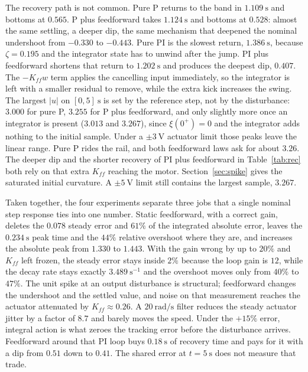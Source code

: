 \documentclass[12pt,a4paper]{article}
\begin{document}
The recovery path is not common.
Pure P returns to the band in \(1.109~\mathrm{s}\) and bottoms at \(0.565\).
P plus feedforward takes \(1.124~\mathrm{s}\) and bottoms at \(0.528\): almost the same settling, a deeper dip, the same mechanism that deepened the nominal undershoot from \(-0.330\) to \(-0.443\).
Pure PI is the slowest return, \(1.386~\mathrm{s}\), because \(\zeta=0.195\) and the integrator state has to unwind after the jump.
PI plus feedforward shortens that return to \(1.202~\mathrm{s}\) and produces the deepest dip, \(0.407\).
The \(-K_{ff}w\) term applies the cancelling input immediately, so the integrator is left with a smaller residual to remove, while the extra kick increases the swing.
The largest \(|u|\) on \([0,5]~\mathrm{s}\) is set by the reference step, not by the disturbance: \(3.000\) for pure P, \(3.255\) for P plus feedforward, and only slightly more once an integrator is present (\(3.013\) and \(3.267\)), since \(\xi(0^+)=0\) and the integrator adds nothing to the initial sample.
Under a \(\pm 3~\mathrm{V}\) actuator limit those peaks leave the linear range. Pure P rides the rail, and both feedforward laws ask for about \(3.26\).
The deeper dip and the shorter recovery of PI plus feedforward in Table~\ref{tab:rec} both rely on that extra \(K_{ff}\) reaching the motor.
Section~\ref{sec:spike} gives the saturated initial curvature. A \(\pm 5~\mathrm{V}\) limit still contains the largest sample, \(3.267\).

Taken together, the four experiments separate three jobs that a single nominal step response ties into one number.
Static feedforward, with a correct gain, deletes the \(0.078\) steady error and \(61\%\) of the integrated absolute error, leaves the \(0.234~\mathrm{s}\) peak time and the \(44\%\) relative overshoot where they are, and increases the absolute peak from \(1.330\) to \(1.443\).
With the gain wrong by up to \(20\%\) and \(K_{ff}\) left frozen, the steady error stays inside \(2\%\) because the loop gain is \(12\), while the decay rate stays exactly \(3.489~\mathrm{s}^{-1}\) and the overshoot moves only from \(40\%\) to \(47\%\).
The unit spike at an output disturbance is structural; feedforward changes the undershoot and the settled value, and noise on that measurement reaches the actuator attenuated by \(K_{ff}\approx 0.26\). A \(20~\mathrm{rad/s}\) filter reduces the steady actuator jitter by a factor of \(8.7\) and barely moves the speed.
Under the \(+15\%\) error, integral action is what zeroes the tracking error before the disturbance arrives. Feedforward around that PI loop buys \(0.18~\mathrm{s}\) of recovery time and pays for it with a dip from \(0.51\) down to \(0.41\). The shared error at \(t=5~\mathrm{s}\) does not measure that trade.
\end{document}
